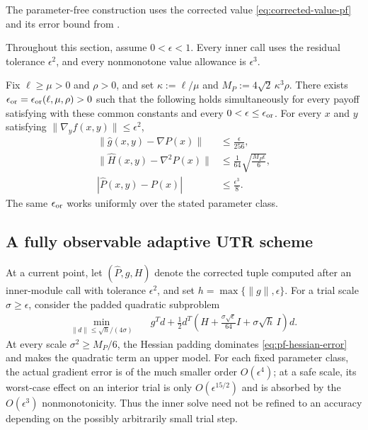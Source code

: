 \documentclass{article}
\begin{document}
The parameter-free construction uses the corrected value
\eqref{eq:corrected-value-pf} and its error bound from
.

Throughout this section, assume $0<\epsilon<1$.  Every inner call uses
the residual tolerance $\epsilon^2$, and every nonmonotone value
allowance is $\epsilon^3$.

\begin{lemma}
\label{lem:pf-asymptotic-oracle}
Fix $\ell\ge\mu>0$ and $\rho>0$, and set
$\kappa:=\ell/\mu$ and $M_P:=4\sqrt2\,\kappa^3\rho$.  There exists
$\epsilon_{\rm or}=\epsilon_{\rm or}(\ell,\mu,\rho)>0$ such that the
following holds simultaneously for every payoff satisfying
 with these common constants and every
$0<\epsilon\le\epsilon_{\rm or}$.  For every $x$ and $y$ satisfying
$\|\nabla_y f(x,y)\|\le\epsilon^2$,
\begin{subequations}\label{eq:pf-oracle-bounds}
\begin{align}
 \|\widehat g(x,y)-\nabla P(x)\|
 &\le\frac\epsilon{256},
       \label{eq:pf-gradient-error}\\
 \|\widehat H(x,y)-\nabla^2P(x)\|
 &\le\frac1{64}\sqrt{\frac{M_P\epsilon}{6}},
       \label{eq:pf-hessian-error}\\
 |\widehat P(x,y)-P(x)|
 &\le\frac{\epsilon^3}{8}.
       \label{eq:pf-value-error}
\end{align}
\end{subequations}
The same $\epsilon_{\rm or}$ works uniformly over the stated parameter
class.
\end{lemma}




\subsection{A fully observable adaptive UTR scheme}

At a current point, let $(\widehat P,g,H)$ denote the corrected tuple
computed after an inner-module call with tolerance $\epsilon^2$,
and set
$h=\max\{\|g\|,\epsilon\}$.  For a trial scale $\sigma\ge\epsilon$,
consider the padded quadratic subproblem
\begin{equation}\label{eq:pf-robust-subproblem}
\begin{aligned}
 \min_{\|d\|\le\sqrt h/(4\sigma)}\quad
 &g^Td+\frac12d^T\left(
 H+\frac{\sigma\sqrt\epsilon}{64}I
   +\sigma\sqrt h\,I
 \right)d.
\end{aligned}
\end{equation}
At every scale $\sigma^2\ge M_P/6$, the Hessian padding dominates
\eqref{eq:pf-hessian-error} and makes the quadratic term an upper
model.  For each fixed parameter class, the actual gradient error is of
the much smaller order $O(\epsilon^4)$;
at a safe scale, its worst-case effect on an interior trial is only
$O(\epsilon^{15/2})$ and is absorbed by the $O(\epsilon^3)$
nonmonotonicity.  Thus the inner solve need not be
refined to an accuracy depending on the possibly arbitrarily small
trial step.
\end{document}
